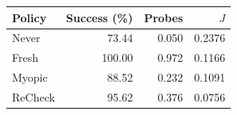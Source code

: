 \begin{tabular}{lrrr}
\toprule
Policy & Success (\%) & Probes & $J$ \\
\midrule
Never & 73.44 & 0.050 & 0.2376 \\
Fresh & 100.00 & 0.972 & 0.1166 \\
Myopic & 88.52 & 0.232 & 0.1091 \\
ReCheck & 95.62 & 0.376 & 0.0756 \\
\bottomrule
\end{tabular}